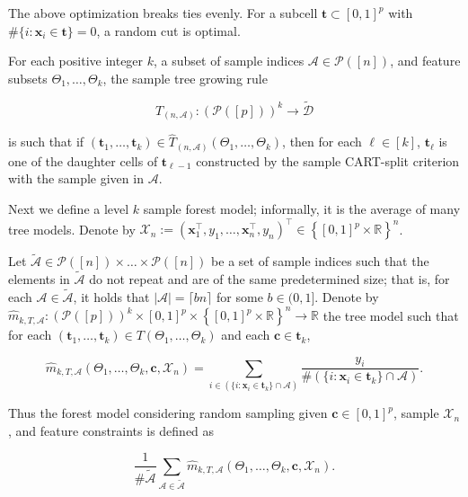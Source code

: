 The above optimization breaks ties evenly. For a subcell \(\boldsymbol{t} \subset [0,1]^p\) with \(\# \{i: \boldsymbol{x}_i \in \boldsymbol{t}\} = 0\), a random cut is optimal. 

\begin{definition}\label{stat.learn.def.sample.tree.grow.rule}

For each positive integer \(k\), a subset of sample indices \(\mathcal{A} \in \mathcal{P}\left([n] \right)\), and feature subsets \(\Theta_1, \ldots, \Theta_k\), the sample tree growing rule 

\[
\hat{T}_{(n,\mathcal{A})}: \left( \mathcal{P}\left( [p]\right) \right)^k \to \tilde{\mathcal{D}}
\] 

is such that if \((\boldsymbol{t}_1, \ldots, \boldsymbol{t}_k) \in \hat{T}_{(n,\mathcal{A})} (\Theta_1, \ldots, \Theta_k)\), then for each \(\ell \in [k]\), \(\boldsymbol{t}_\ell\) is one of the daughter cells of \(\boldsymbol{t}_{\ell -1}\) constructed by the sample CART-split criterion with the sample given in \(\mathcal{A}\).

\end{definition}

Next we define a level \(k\) sample forest model; informally, it is the average of many tree models. Denote by \(\mathcal{X}_n := (\boldsymbol{x}_1^\top, y_1, \ldots, \boldsymbol{x}_n^\top, y_n)^\top \in \left\{[0, 1]^p \times \mathbb{R} \right\}^n\).

\begin{definition}

Let \(\tilde{\mathcal{A}} \in \mathcal{P}\left([n] \right) \times \ldots \times \mathcal{P}\left([n] \right) \) be a set of sample indices such that the elements in \(\tilde{\mathcal{A}}\) do not repeat and are of the same predetermined size; that is, for each \(\mathcal{A} \in \tilde{\mathcal{A}}\), it holds that \(\left| \mathcal{A} \right| = \lceil bn \rceil\) for some \(b \in (0, 1]\). Denote by \(\hat{m}_{k, T, \mathcal{A}}: \left( \mathcal{P}\left( [p]\right) \right)^k \times [0, 1]^p \times \left\{[0, 1]^p \times \mathbb{R} \right\}^n  \to \mathbb{R}\) the tree model such that for each \((\boldsymbol{t}_1, \ldots, \boldsymbol{t}_k) \in T(\Theta_1, \ldots, \Theta_k)\) and each \(\boldsymbol{c} \in \boldsymbol{t}_k\),


\[
\hat{m}_{k, T, \mathcal{A}}\left(\Theta_1, \ldots, \Theta_k, \boldsymbol{c}, \mathcal{X}_n\right) = \sum_{i \in (\{i: \boldsymbol{x}_i \in \boldsymbol{t}_k\} \cap \mathcal{A})} \frac{y_i}{\# (\{i: \boldsymbol{x}_i \in \boldsymbol{t}_k\} \cap \mathcal{A})}.
\]

Thus the forest model considering random sampling given \(\boldsymbol{c} \in [0,1]^p\), sample \(\mathcal{X}_n\), and feature constraints is defined as 

\[
\frac{1}{\# \tilde{\mathcal{A}}} \sum_{\mathcal{A} \in \tilde{\mathcal{A}}} \hat{m}_{k, T, \mathcal{A}}\left(\Theta_1, \ldots, \Theta_k, \boldsymbol{c}, \mathcal{X}_n\right).
\]

\end{definition}

